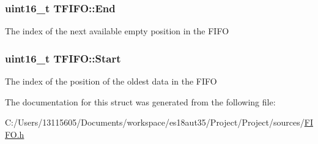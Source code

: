 \subsubsection[{End}]{\setlength{\rightskip}{0pt plus 5cm}uint16\+\_\+t T\+F\+I\+F\+O\+::\+End}\label{struct_t_f_i_f_o_a5063b875898a6f23a97aa3ca17f0544b}
The index of the next available empty position in the F\+I\+F\+O \hypertarget{struct_t_f_i_f_o_a092a7559431a12616672354641908167}{}
\subsubsection[{Start}]{\setlength{\rightskip}{0pt plus 5cm}uint16\+\_\+t T\+F\+I\+F\+O\+::\+Start}\label{struct_t_f_i_f_o_a092a7559431a12616672354641908167}
The index of the position of the oldest data in the F\+I\+F\+O 

The documentation for this struct was generated from the following file\+:\begin{DoxyCompactItemize}
\item 
C\+:/\+Users/13115605/\+Documents/workspace/es18aut35/\+Project/\+Project/sources/\hyperlink{_f_i_f_o_8h}{F\+I\+F\+O.\+h}\end{DoxyCompactItemize}
